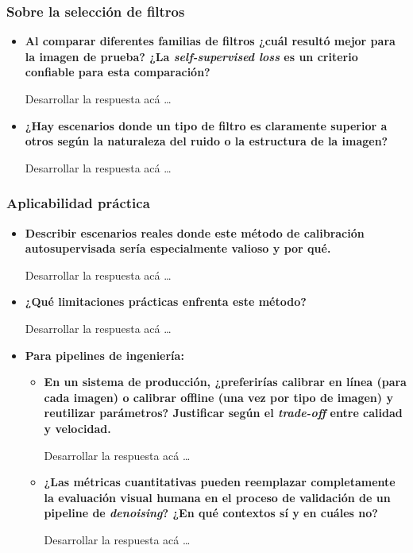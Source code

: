         \subsubsection*{Sobre la selección de filtros}
        \begin{itemize}[leftmargin=*]
            \item \textbf{Al comparar diferentes familias de filtros ¿cuál resultó mejor para la imagen de prueba? ¿La \textit{self-supervised loss} es un criterio confiable para esta comparación?} 
            
                Desarrollar la respuesta acá \dots
    
            \item \textbf{¿Hay escenarios donde un tipo de filtro es claramente superior a otros según la naturaleza del ruido o la estructura de la imagen?}
            
                Desarrollar la respuesta acá \dots

        \end{itemize}

        \subsubsection*{Aplicabilidad práctica}
        \begin{itemize}[leftmargin=*]
            \item \textbf{Describir escenarios reales donde este método de calibración autosupervisada sería especialmente valioso y por qué.}
            
                Desarrollar la respuesta acá \dots
            
            \item \textbf{¿Qué limitaciones prácticas enfrenta este método?}
            
                Desarrollar la respuesta acá \dots

            \item \textbf{Para pipelines de ingeniería:}
            \begin{itemize}[leftmargin=*]
                \item \textbf{En un sistema de producción, ¿preferirías calibrar en línea (para cada imagen) o calibrar offline (una vez por tipo de imagen) y reutilizar parámetros? Justificar según el \textit{trade-off} entre calidad y velocidad.}

                    Desarrollar la respuesta acá \dots

                \item \textbf{¿Las métricas cuantitativas pueden reemplazar completamente la evaluación visual humana en el proceso de validación de un pipeline de \textit{denoising}? ¿En qué contextos sí y en cuáles no? }

                    Desarrollar la respuesta acá \dots

            \end{itemize}

        \end{itemize}